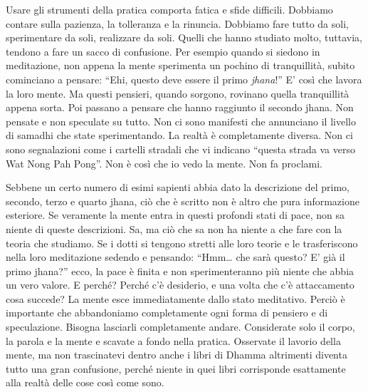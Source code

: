 Usare gli strumenti della pratica comporta fatica e sfide difficili.
Dobbiamo contare sulla pazienza, la tolleranza e la rinuncia. Dobbiamo
fare tutto da soli, sperimentare da soli, realizzare da soli. Quelli che
hanno studiato molto, tuttavia, tendono a fare un sacco di confusione.
Per esempio quando si siedono in meditazione, non appena la mente
sperimenta un pochino di tranquillità, subito cominciano a pensare:
``Ehi, questo deve essere il primo \emph{jhana}!''%
E' così che lavora la loro mente. Ma questi pensieri, quando sorgono,
rovinano quella tranquillità appena sorta. Poi passano a pensare che
hanno raggiunto il secondo jhana. Non pensate e non speculate su tutto.
Non ci sono manifesti che annunciano il livello di samadhi che state
sperimentando. La realtà è completamente diversa. Non ci sono
segnalazioni come i cartelli stradali che vi indicano ``questa strada va
verso Wat Nong Pah Pong''. Non è così che io vedo la mente. Non fa
proclami.

Sebbene un certo numero di esimi sapienti abbia dato la descrizione del
primo, secondo, terzo e quarto jhana, ciò che è scritto non è altro che
pura informazione esteriore. Se veramente la mente entra in questi
profondi stati di pace, non sa niente di queste descrizioni. Sa, ma ciò
che sa non ha niente a che fare con la teoria che studiamo. Se i dotti
si tengono stretti alle loro teorie e le trasferiscono nella loro
meditazione sedendo e pensando: ``Hmm\ldots{} che sarà questo? E' già il
primo jhana?'' ecco, la pace è finita e non sperimenteranno più niente
che abbia un vero valore. E perché? Perché c'è desiderio, e una volta
che c'è attaccamento cosa succede? La mente esce immediatamente dallo
stato meditativo. Perciò è importante che abbandoniamo completamente
ogni forma di pensiero e di speculazione. Bisogna lasciarli
completamente andare. Considerate solo il corpo, la parola e la mente e
scavate a fondo nella pratica. Osservate il lavorio della mente, ma non
trascinatevi dentro anche i libri di Dhamma altrimenti diventa tutto una
gran confusione, perché niente in quei libri corrisponde esattamente
alla realtà delle cose così come sono.

